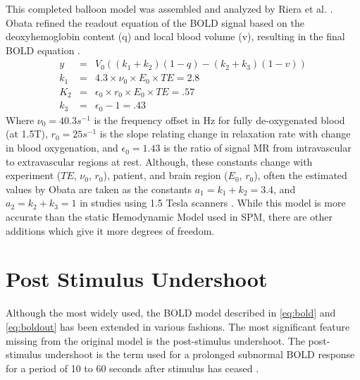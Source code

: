 This completed balloon model was assembled and analyzed
by Riera et al. \cite{Riera2003}. Obata refined the readout equation 
of the BOLD signal based on the
deoxyhemoglobin content (q) and local blood volume (v), resulting in the
final BOLD equation \cite{Obata2004}.
\begin{eqnarray}
y   &=& V_0((k_1 + k_2)(1-q) - (k_2 + k_3)(1-v))\\
k_1 &=& 4.3 \times \nu_0 \times E_0 \times TE = 2.8\\
K_2 &=& \epsilon_0 \times r_0 \times E_0 \times TE = .57\\
k_3 &=& \epsilon_0 - 1 = .43
\label{eq:boldout}
\end{eqnarray}
Where $\nu_0 = 40.3 s^{-1}$  is the frequency offset in Hz for fully
de-oxygenated blood (at 1.5T), $r_0 = 25 s^{-1}$  is the slope relating
change in relaxation rate with change in blood oxygenation, and
$\epsilon_0 = 1.43$ is the 
ratio of signal MR from intravascular to extravascular regions at rest. Although,
these constants change with experiment ($TE$, $\nu_0$, $r_0$),
patient, and brain 
region ($E_0$, $r_0$), often the estimated values by Obata are 
taken as the constants $a_1 = k_1 + k_2 = 3.4$, and $a_2 = k_2+k_3 = 1$ in 
studies using 1.5 Tesla scanners \cite{Obata2004}.
While this model is more accurate than the static Hemodynamic Model used in SPM,
there are other additions which give it more degrees of freedom. 

\section{Post Stimulus Undershoot}
\label{sec:Post Stimulus Undershoot}
Although the most widely used, the BOLD model described in \autoref{eq:bold}
and \autoref{eq:boldout} has been extended in various fashions. The most
significant feature missing from the original model is the 
post-stimulus undershoot.
The post-stimulus undershoot is the term used for a prolonged subnormal
BOLD response for a period of 10 to 60 seconds after stimulus has
ceased \cite{Chen2009,Mandeville1999a}.

